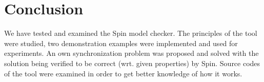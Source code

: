 
\section*{Conclusion}
\label{sec:conclusion}

We have tested and examined the Spin model checker. The principles of the tool were studied, two demonstration examples were implemented and used for experiments. An own synchronization problem was proposed and solved with the solution being verified to be correct (wrt. given properties) by Spin. Source codes of the tool were examined in order to get better knowledge of how it works.

